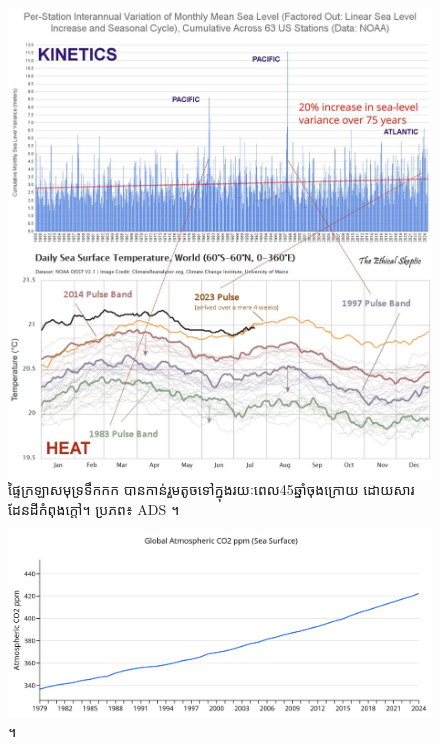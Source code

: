 \documentclass[10pt,twocolumn,letterpaper]{article}
\begin{document}
\begin{figure}[t]
\begin{center}
\includegraphics[width=1\textwidth]{sealevel.jpeg}
\end{center}
   \caption{ផ្ទៃក្រឡាសមុទ្រទឹកកក បានកាន់រួមតូចទៅក្នុងរយៈពេល45ឆ្នាំចុងក្រោយ ដោយសារដែនដីកំពុងក្ដៅ។ ប្រភព៖ ADS \cite{149}។}
\label{fig:22}
\end{figure}

\begin{figure}[t]
\begin{center}
\includegraphics[width=1\textwidth]{co2.jpg}
\end{center}
   \caption{ \cite{148,129}។}
\label{fig:23}
\end{figure}
\end{document}
